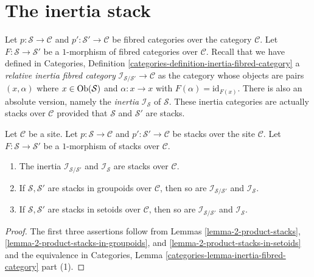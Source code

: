 \section{The inertia stack}
\label{section-the-inertia-stack}

\noindent
Let
$p : \mathcal{S} \to \mathcal{C}$ and
$p' : \mathcal{S}' \to \mathcal{C}$
be fibred categories over the category $\mathcal{C}$.
Let $F : \mathcal{S} \to \mathcal{S}'$ be a $1$-morphism of
fibred categories over $\mathcal{C}$.
Recall that we have defined in
Categories, Definition \ref{categories-definition-inertia-fibred-category}
a {\it relative inertia fibred category}
$\mathcal{I}_{\mathcal{S}/\mathcal{S}'} \to \mathcal{C}$ as the
category whose objects are pairs $(x , \alpha)$ where
$x \in \mathop{\mathrm{Ob}}\nolimits(\mathcal{S})$ and $\alpha : x \to x$ with
$F(\alpha) = \text{id}_{F(x)}$. There is also an absolute version,
namely the {\it inertia} $\mathcal{I}_\mathcal{S}$ of $\mathcal{S}$.
These inertia categories are actually stacks over $\mathcal{C}$ provided
that $\mathcal{S}$ and $\mathcal{S}'$ are stacks.

\begin{lemma}
\label{lemma-inertia}
Let $\mathcal{C}$ be a site. Let
$p : \mathcal{S} \to \mathcal{C}$ and
$p' : \mathcal{S}' \to \mathcal{C}$
be stacks over the site $\mathcal{C}$.
Let $F : \mathcal{S} \to \mathcal{S}'$ be a $1$-morphism of
stacks over $\mathcal{C}$.
\begin{enumerate}
\item The inertia $\mathcal{I}_{\mathcal{S}/\mathcal{S}'}$ and
$\mathcal{I}_\mathcal{S}$ are stacks over $\mathcal{C}$.
\item If $\mathcal{S}, \mathcal{S}'$ are stacks in groupoids over
$\mathcal{C}$, then so are $\mathcal{I}_{\mathcal{S}/\mathcal{S}'}$ and
$\mathcal{I}_\mathcal{S}$.
\item If $\mathcal{S}, \mathcal{S}'$ are stacks in setoids over $\mathcal{C}$,
then so are $\mathcal{I}_{\mathcal{S}/\mathcal{S}'}$ and
$\mathcal{I}_\mathcal{S}$.
\end{enumerate}
\end{lemma}

\begin{proof}
The first three assertions follow from
Lemmas \ref{lemma-2-product-stacks},
\ref{lemma-2-product-stacks-in-groupoids}, and
\ref{lemma-2-product-stacks-in-setoids}
and the equivalence in
Categories, Lemma \ref{categories-lemma-inertia-fibred-category} part (1).
\end{proof}

